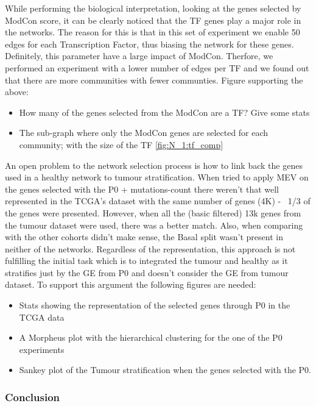 While performing the biological interpretation, looking at the genes selected by ModCon score, it can be clearly noticed that the TF genes play a major role in the networks. The reason for this is that in this set of experiment we enable 50 edges for each Transcription Factor, thus biasing the network for these genes. Definitely, this parameter have a large impact of ModCon. Therfore, we performed an experiment with a lower number of edges per TF and we found out that there are more communities with fewer communties.
Figure supporting the above:
\begin{itemize}
    \item How many of the genes selected from the ModCon are a TF? Give some stats
    \item The sub-graph where only the ModCon genes are selected for each community; with the size of the TF \ref{fig:N_1:tf_comp}
\end{itemize}

An open problem to the network selection process is how to link back the genes used in a healthy network to tumour stratification. When tried to apply MEV on the genes selected with the P0 + mutations-count there weren't that well represented in the TCGA's dataset with the same number of genes (4K) - ~1/3 of the genes were presented. However, when all the (basic filtered) 13k genes from the tumour dataset were used, there was a better match. Also, when comparing with the other cohorts didn't make sense, the Basal split wasn't present in neither of the networks. Regardless of the representation, this approach is not fulfilling the initial task which is to integrated the tumour and healthy as it stratifies just by the GE from P0 and doesn't consider the GE from tumour dataset.
To support this argument the following figures are needed:
\begin{itemize}
    \item Stats showing the representation of the selected genes through P0 in the TCGA data
    \item A Morpheus plot with the hierarchical clustering for the one of the P0 experiments
    \item Sankey plot of the Tumour stratification when the genes selected with the P0.
\end{itemize}


\subsubsection{Conclusion}

